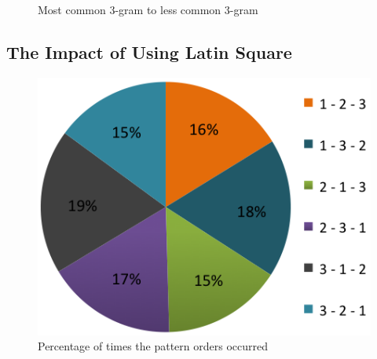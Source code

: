 		\begin{figure}[H]
	    \caption{Most common 3-gram to less common 3-gram}
	    \label{fig:3gram}
	  \end{figure}

	\clearpage
	\subsection{The Impact of Using Latin Square} \label{sec:latinsquareimpact}

		\begin{figure}[H]
      \centering
      \includegraphics[scale=0.5]{pics/analysis/patternOrder.png}
      \caption{Percentage of times the pattern orders occurred}
      \label{fig:patternOrder}
    \end{figure}

  

